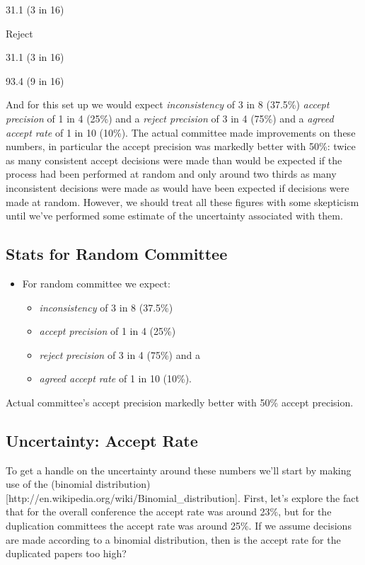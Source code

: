 \documentclass[a4paperpaper,]{article}
\providecommand{\tightlist}{%
  \setlength{\itemsep}{0pt}\setlength{\parskip}{0pt}}
\begin{document}
31.1 (3 in 16)

Reject

31.1 (3 in 16)

93.4 (9 in 16)

And for this set up we would expect \emph{inconsistency} of 3 in 8
(37.5\%) \emph{accept precision} of 1 in 4 (25\%) and a \emph{reject
precision} of 3 in 4 (75\%) and a \emph{agreed accept rate} of 1 in 10
(10\%). The actual committee made improvements on these numbers, in
particular the accept precision was markedly better with 50\%: twice as
many consistent accept decisions were made than would be expected if the
process had been performed at random and only around two thirds as many
inconsistent decisions were made as would have been expected if
decisions were made at random. However, we should treat all these
figures with some skepticism until we've performed some estimate of the
uncertainty associated with them.

\hypertarget{stats-for-random-committee}{%
\subsection{Stats for Random
Committee}\label{stats-for-random-committee}}

\begin{itemize}
\tightlist
\item
  For random committee we expect:

  \begin{itemize}
  \tightlist
  \item
    \emph{inconsistency} of 3 in 8 (37.5\%)
  \item
    \emph{accept precision} of 1 in 4 (25\%)
  \item
    \emph{reject precision} of 3 in 4 (75\%) and a
  \item
    \emph{agreed accept rate} of 1 in 10 (10\%).
  \end{itemize}
\end{itemize}

Actual committee's accept precision markedly better with 50\% accept
precision.

\hypertarget{uncertainty-accept-rate}{%
\subsection{Uncertainty: Accept Rate}\label{uncertainty-accept-rate}}

To get a handle on the uncertainty around these numbers we'll start by
making use of the (binomial
distribution){[}http://en.wikipedia.org/wiki/Binomial\_distribution{]}.
First, let's explore the fact that for the overall conference the accept
rate was around 23\%, but for the duplication committees the accept rate
was around 25\%. If we assume decisions are made according to a binomial
distribution, then is the accept rate for the duplicated papers too
high?
\end{document}
